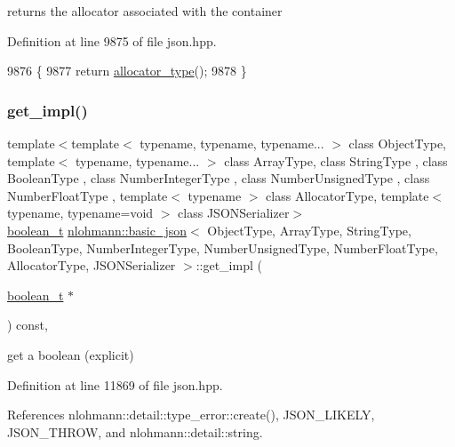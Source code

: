 returns the allocator associated with the container 



Definition at line 9875 of file json.\+hpp.


\begin{DoxyCode}
9876     \{
9877         \textcolor{keywordflow}{return} \hyperlink{classnlohmann_1_1basic__json_a86ce930490cf7773b26f5ef49c04a350}{allocator\_type}();
9878     \}
\end{DoxyCode}
\mbox{\label{classnlohmann_1_1basic__json_ac686d87a2261f85f1df97035b14a6e3a}} 
\subsubsection{\texorpdfstring{get\+\_\+impl()}{get\_impl()}}
{\footnotesize\ttfamily template$<$template$<$ typename, typename, typename... $>$ class Object\+Type, template$<$ typename, typename... $>$ class Array\+Type, class String\+Type , class Boolean\+Type , class Number\+Integer\+Type , class Number\+Unsigned\+Type , class Number\+Float\+Type , template$<$ typename $>$ class Allocator\+Type, template$<$ typename, typename=void $>$ class J\+S\+O\+N\+Serializer$>$ \\
\hyperlink{classnlohmann_1_1basic__json_a4c919102a9b4fe0d588af64801436082}{boolean\+\_\+t} \hyperlink{classnlohmann_1_1basic__json}{nlohmann\+::basic\+\_\+json}$<$ Object\+Type, Array\+Type, String\+Type, Boolean\+Type, Number\+Integer\+Type, Number\+Unsigned\+Type, Number\+Float\+Type, Allocator\+Type, J\+S\+O\+N\+Serializer $>$\+::get\+\_\+impl (\begin{DoxyParamCaption}\item[{\hyperlink{classnlohmann_1_1basic__json_a4c919102a9b4fe0d588af64801436082}{boolean\+\_\+t} $\ast$}]{ }\end{DoxyParamCaption}) const\hspace{0.3cm}{\ttfamily [inline]}, {\ttfamily [private]}}



get a boolean (explicit) 



Definition at line 11869 of file json.\+hpp.



References nlohmann\+::detail\+::type\+\_\+error\+::create(), J\+S\+O\+N\+\_\+\+L\+I\+K\+E\+LY, J\+S\+O\+N\+\_\+\+T\+H\+R\+OW, and nlohmann\+::detail\+::string.


